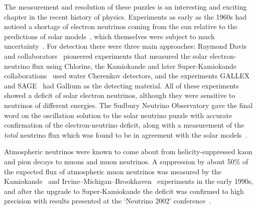   The measurement and resolution of these puzzles is an interesting and exciting
  chapter in the recent history of physics. Experiments as early as the 1960s
  had noticed a shortage of electron neutrinos coming from the sun relative to
  the predictions of solar models~\cite{RevModPhys.60.297, 1988ApJ...335..415T,
    RevModPhys.64.885, RevModPhys.67.781}, which themselves were subject to much
  uncertainty~\cite{Morrison:1992bz}. For detection there were three main
  approaches: Raymond Davis and collaborators~\cite{PhysRevLett.12.303}
  pioneered experiments that measured the solar electron-neutrino flux using
  Chlorine, the Kamiokande and later Super-Kamiokande
  collaborations~\cite{Hirata:1989zj, Hirata:1990xa} used water Cherenkov
  detectors, and the experiments GALLEX~\cite{Hampel:1998xg} and
  SAGE~\cite{Abdurashitov:1999zd} had Gallium as the detecting material. All of
  these experiments showed a deficit of solar electron neutrinos, although they
  were sensitive to neutrinos of different energies. The Sudbury Neutrino
  Observatory gave the final word on the oscillation solution to the solar
  neutrino puzzle with accurate confirmation of the electron-neutrino deficit,
  along with a measurement of the \textit{total} neutrino flux which was found
  to be in agreement with the solar models~\cite{Ahmad:2001an, Ahmad:2002jz}.

  Atmospheric neutrinos were known to come about from helicity-suppressed kaon
  and pion decays to muons and muon neutrinos. A suppression by about 50\% of
  the expected flux of atmospheric muon neutrinos was measured by the
  Kamiokande~\cite{Hirata:1992ku} and
  Irvine--Michigan--Brookhaven~\cite{BeckerSzendy:1995vr} experiments in the
  early 1990s, and after the upgrade to Super-Kamiokande the deficit was
  confirmed to high precision with results presented at the `Neutrino 2002'
  conference~\cite{Fukuda:1998mi, vonFeilitzsch:2003mh, shiozawa:2002,
    Smy:2002rz}.

